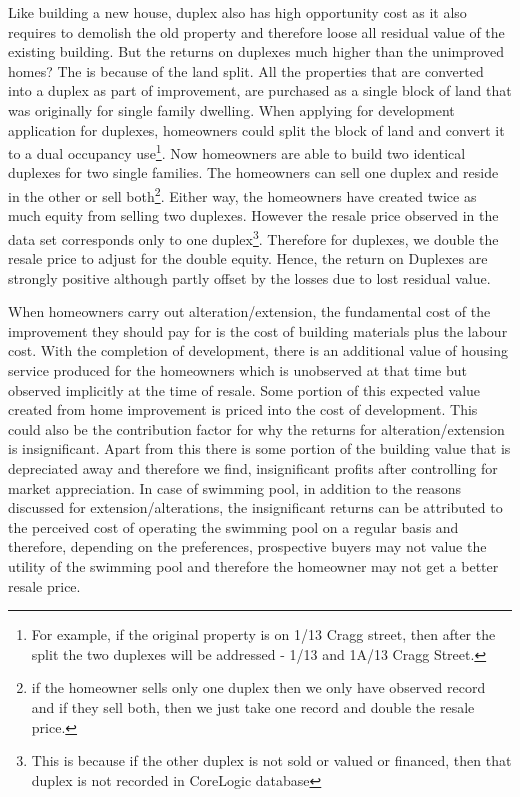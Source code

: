 \documentclass{article}
\begin{document}
Like building a new house, duplex also has high opportunity cost as it also requires to demolish the old property and therefore loose all residual value of the existing building. But the returns on duplexes much higher than the unimproved homes? The is because of the land split. All the properties that are converted into a duplex as part of improvement, are purchased as a single block of land that was originally for single family dwelling. When applying for development application for duplexes, homeowners could split the block of land and convert it to a dual occupancy use\footnote{For example, if the original property is on 1/13 Cragg street, then after the split the two duplexes will be addressed - 1/13 and 1A/13 Cragg Street.}. Now homeowners are able to build two identical duplexes for two single families. The homeowners can sell one duplex and reside in the other or sell both\footnote{if the homeowner sells only one duplex then we only have observed record and if they sell both, then we just take one record and double the resale price.}.  Either way, the homeowners have created twice as much equity from selling two duplexes. However the resale price observed in the data set corresponds only to one duplex\footnote{This is because if the other duplex is not sold or valued or financed, then that duplex is not recorded in CoreLogic database}. Therefore for duplexes, we double the resale price to adjust for the double equity. Hence, the return on Duplexes are strongly positive although partly offset by the losses due to lost residual value.

When homeowners carry out alteration/extension, the fundamental cost of the improvement they should pay for is the cost of building materials plus the labour cost. With the completion of development, there is an additional value of housing service produced for the homeowners which is unobserved at that time but observed implicitly at the time of resale. Some portion of this expected value created from home improvement is priced into the cost of development. This could also be the contribution factor for why the returns for alteration/extension is insignificant.
Apart from this there is some portion of the building value that is depreciated away and therefore we find, insignificant profits after controlling for market appreciation. In case of swimming pool, in addition to the reasons discussed for extension/alterations, the insignificant returns can be attributed to the perceived cost of operating the swimming pool on a regular basis and therefore, depending on the preferences, prospective buyers may not value the utility of the swimming pool and therefore the homeowner may not get a better resale price.
\end{document}

